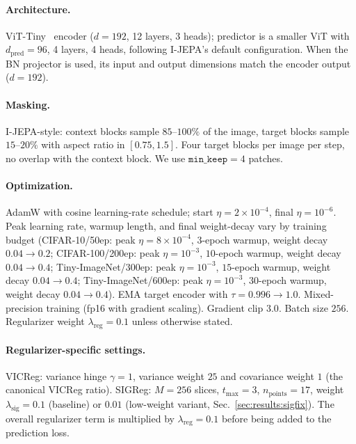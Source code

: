 \documentclass{article}
\begin{document}
\paragraph{Architecture.}
ViT-Tiny~\citep{dosovitskiy2021vit} encoder ($d{=}192$, 12 layers, 3 heads); predictor is a smaller ViT with $d_\text{pred}{=}96$, 4 layers, 4 heads, following I-JEPA's default configuration. When the BN projector is used, its input and output dimensions match the encoder output ($d{=}192$).

\paragraph{Masking.}
I-JEPA-style: context blocks sample $85$--$100\%$ of the image, target blocks sample $15$--$20\%$ with aspect ratio in $[0.75, 1.5]$. Four target blocks per image per step, no overlap with the context block. We use $\texttt{min\_keep}{=}4$ patches.

\paragraph{Optimization.}
AdamW with cosine learning-rate schedule; start $\eta{=}2{\times}10^{-4}$, final $\eta{=}10^{-6}$. Peak learning rate, warmup length, and final weight-decay vary by training budget (CIFAR-10/50ep: peak $\eta{=}8{\times}10^{-4}$, $3$-epoch warmup, weight decay $0.04 \to 0.2$; CIFAR-100/200ep: peak $\eta{=}10^{-3}$, $10$-epoch warmup, weight decay $0.04 \to 0.4$; Tiny-ImageNet/300ep: peak $\eta{=}10^{-3}$, $15$-epoch warmup, weight decay $0.04 \to 0.4$; Tiny-ImageNet/600ep: peak $\eta{=}10^{-3}$, $30$-epoch warmup, weight decay $0.04 \to 0.4$). EMA target encoder with $\tau{=}0.996 \to 1.0$. Mixed-precision training (fp16 with gradient scaling). Gradient clip $3.0$. Batch size $256$. Regularizer weight $\lambda_{\text{reg}}{=}0.1$ unless otherwise stated.

\paragraph{Regularizer-specific settings.}
VICReg: variance hinge $\gamma{=}1$, variance weight $25$ and covariance weight $1$ (the canonical VICReg ratio). SIGReg: $M{=}256$ slices, $t_{\max}{=}3$, $n_{\text{points}}{=}17$, weight $\lambda_{\text{sig}}{=}0.1$ (baseline) or $0.01$ (low-weight variant, Sec.~\ref{sec:results:sigfix}). The overall regularizer term is multiplied by $\lambda_{\text{reg}}{=}0.1$ before being added to the prediction loss.
\end{document}
